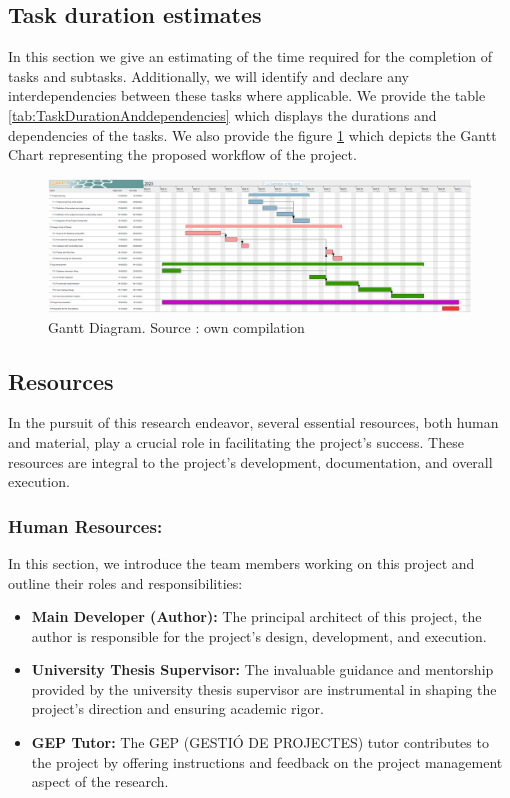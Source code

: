 \subsection{Task duration estimates}
In this section we give an estimating of the time required for the completion of tasks and subtasks. Additionally, we will identify and declare any interdependencies between these tasks where applicable. 
We provide the table \ref{tab:TaskDurationAnddependencies} which displays the durations and dependencies of the tasks. 
We also provide the figure \ref{fig:Gantt} which depicts the Gantt Chart representing the proposed workflow of the project.

\begin{landscape}
\begin{figure}[!ht]
  \centering
  \includegraphics[scale=0.4]{GEP2/Gant.png}
  \caption{Gantt Diagram. Source : own compilation}
  \label{fig:Gantt}
\end{figure}    
\end{landscape}

\subsection{Resources}
In the pursuit of this research endeavor, several essential resources, both human and material, play a crucial role in facilitating the project's success. These resources are integral to the project's development, documentation, and overall execution.
\subsubsection{Human Resources:}
\label{sec:human_resources}
In this section, we introduce the team members working on this project and outline their roles and responsibilities:

\begin{itemize}
    \item \hypertarget{ht:author}{}\textbf{Main Developer (Author):} The principal architect of this project, the author is responsible for the project's design, development, and execution.

    \item \hypertarget{ht:supervisor}{}\textbf{University Thesis Supervisor:} The invaluable guidance and mentorship provided by the university thesis supervisor are instrumental in shaping the project's direction and ensuring academic rigor.

    \item \hypertarget{ht:GEPtutor}{}\textbf{GEP Tutor:} The GEP (GESTIÓ DE PROJECTES) tutor contributes to the project by offering instructions and feedback on the project management aspect of the research.
\end{itemize}

